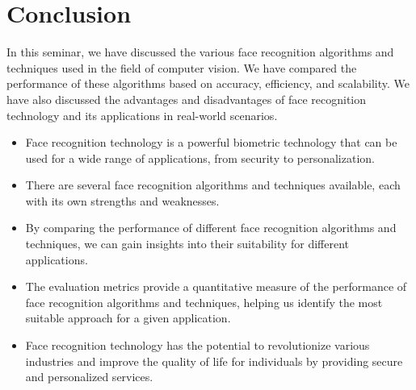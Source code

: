 \documentclass[openany]{report}
\begin{document}
\chapter{Conclusion}
In this seminar, we have discussed the various face recognition algorithms and techniques used in the field of computer vision. We have compared the performance of these algorithms based on accuracy, efficiency, and scalability. We have also discussed the advantages and disadvantages of face recognition technology and its applications in real-world scenarios.
\begin{itemize}
    \item Face recognition technology is a powerful biometric technology that can be used for a wide range of applications, from security to personalization.
    \item There are several face recognition algorithms and techniques available, each with its own strengths and weaknesses.
    \item By comparing the performance of different face recognition algorithms and techniques, we can gain insights into their suitability for different applications.
    \item The evaluation metrics provide a quantitative measure of the performance of face recognition algorithms and techniques, helping us identify the most suitable approach for a given application.
    \item Face recognition technology has the potential to revolutionize various industries and improve the quality of life for individuals by providing secure and personalized services.
\end{itemize}
\clearpage
\end{document}
